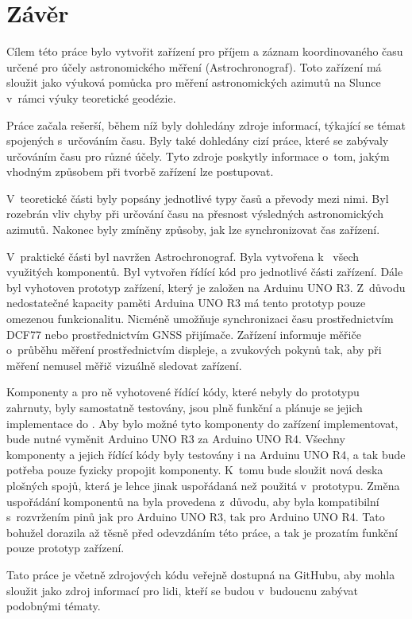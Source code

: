 \chapter{Závěr}
\label{7-zaver}

Cílem této práce bylo vytvořit zařízení pro příjem a záznam koordinovaného času určené pro účely astronomického měření (Astrochronograf). Toto zařízení má sloužit jako výuková pomůcka pro měření astronomických azimutů na Slunce v~rámci výuky teoretické geodézie.

Práce začala rešerší, během níž byly dohledány zdroje informací, týkající se témat spojených s~určováním času. Byly také dohledány cizí práce, které se zabývaly určováním času pro různé účely. Tyto zdroje poskytly informace o~tom, jakým vhodným způsobem při tvorbě zařízení lze postupovat.

V~teoretické části byly popsány jednotlivé typy časů a převody mezi nimi. Byl rozebrán vliv chyby při určování času na přesnost výsledných astronomických azi\-mutů. Nakonec byly zmíněny způsoby, jak lze synchronizovat čas zařízení.

V~praktické části byl navržen Astrochronograf. Byla vytvořena  k~ všech využitých komponentů. Byl vytvořen řídící kód pro jednotlivé části zařízení. Dále byl vyhotoven prototyp zařízení, který je založen na Arduinu UNO R3. Z~dů\-vodu nedostatečné kapacity paměti Arduina UNO R3 má tento prototyp pouze omezenou funkcionalitu. Nicméně umožňuje synchronizaci času prostřednictvím   DCF77 nebo prostřednictvím GNSS přijímače. Zařízení infor\-muje měřiče o~průběhu měření prostřednictvím displeje,  a zvukových pokynů tak, aby při měření nemusel měřič vizuálně sledovat zařízení.

Komponenty a pro ně vyhotovené řídící kódy, které nebyly do prototypu zahrnuty, byly samostatně testovány, jsou plně funkční a plánuje se jejich implementace do . Aby bylo možné tyto komponenty do zařízení implementovat, bude nutné vyměnit Arduino UNO R3 za Arduino UNO R4. Všechny komponenty a jejich řídící kódy byly testovány i na Arduinu UNO R4, a tak bude potřeba pouze fyzicky propojit komponenty. K~tomu bude sloužit nová deska plošných spojů, která je lehce jinak uspořádaná než  použitá v~prototypu. Změna uspořádání komponentů na  byla provedena z~důvodu, aby byla  kompatibilní s~rozvržením pinů jak pro Arduino UNO R3, tak pro Arduino UNO R4. Tato  bohužel dorazila až těsně před odevzdáním této práce, a tak je prozatím funkční pouze prototyp zařízení.

Tato práce je včetně zdrojových kódu veřejně dostupná na GitHubu, aby mohla sloužit jako zdroj informací pro lidi, kteří se budou v~budoucnu zabývat podobnými tématy.

